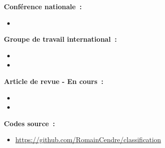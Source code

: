 \textbf{Conférence nationale~:}
\vspace{-0.2cm}
\begin{itemize}
    \item {}
\end{itemize}

\textbf{Groupe de travail international~:}
\vspace{-0.2cm}
\begin{itemize}
    \item {}
    \item {}
\end{itemize}

\textbf{Article de revue - En cours~:}
\vspace{-0.1cm}
\begin{itemize}
    \item {}
    \item {}
\end{itemize}

\textbf{Codes source~:}
\vspace{-0.2cm}
\begin{itemize}
    \item \href{https://github.com/RomainCendre/classification}{https://github.com/RomainCendre/classification}
\end{itemize}